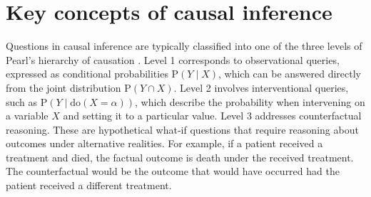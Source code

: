 \section{Key concepts of causal inference}



Questions in causal inference are typically classified into one of the three levels of Pearl's hierarchy of causation \citep{pearl_book2009}. Level 1 corresponds to observational queries, expressed as conditional probabilities $\text{P}(Y \mid X)$, which can be answered directly from the joint distribution $\text{P}(Y \cap X)$. Level 2 involves interventional queries, such as $\text{P}(Y \mid \text{do}(X = \alpha))$, which describe the probability when intervening on a variable $X$ and setting it to a particular value. Level 3 addresses counterfactual reasoning. These are hypothetical what-if questions that require reasoning about outcomes under alternative realities. For example, if a patient received a treatment and died, the factual outcome is death under the received treatment. The counterfactual would be the outcome that would have occurred had the patient received a different treatment.

 


